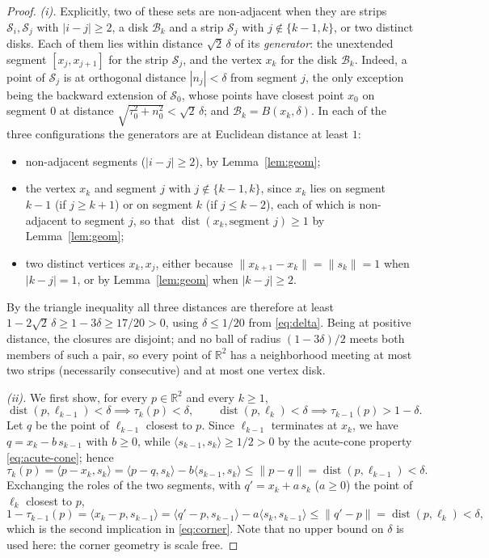 \documentclass[11pt]{article}
\newcommand{\R}{\mathbb{R}}
\newcommand{\ip}[2]{\langle #1,#2\rangle}
\begin{document}
\begin{proof}
\emph{(i).}
Explicitly, two of these sets are non-adjacent when they are strips $\mathcal S_i, \mathcal S_j$ with $|i-j| \ge 2$, a disk $\mathcal B_k$ and a strip $\mathcal S_j$ with $j \notin \{k-1, k\}$, or two distinct disks.
Each of them lies within distance $\sqrt2\,\delta$ of its \emph{generator}: the unextended segment $[x_j, x_{j+1}]$ for the strip $\mathcal S_j$, and the vertex $x_k$ for the disk $\mathcal B_k$.
Indeed, a point of $\mathcal S_j$ is at orthogonal distance $|n_j| < \delta$ from segment $j$, the only exception being the backward extension of $\mathcal S_0$, whose points have closest point $x_0$ on segment $0$ at distance $\sqrt{\tau_0^2 + n_0^2} < \sqrt2\,\delta$; and $\mathcal B_k = B(x_k, \delta)$.
In each of the three configurations the generators are at Euclidean distance at least $1$:
\begin{itemize}
\item non-adjacent segments ($|i-j| \ge 2$), by Lemma~\ref{lem:geom};
\item the vertex $x_k$ and segment $j$ with $j \notin \{k-1, k\}$, since $x_k$ lies on segment $k-1$ (if $j \ge k+1$) or on segment $k$ (if $j \le k-2$), each of which is non-adjacent to segment $j$, so that $\operatorname{dist}(x_k, \text{segment } j) \ge 1$ by Lemma~\ref{lem:geom};
\item two distinct vertices $x_k, x_j$, either because $\|x_{k+1}-x_k\| = \|s_k\| = 1$ when $|k-j| = 1$, or by Lemma~\ref{lem:geom} when $|k-j| \ge 2$.
\end{itemize}
By the triangle inequality all three distances are therefore at least $1 - 2\sqrt2\,\delta \ge 1-3\delta \ge 17/20 > 0$, using $\delta \le 1/20$ from \eqref{eq:delta}.
Being at positive distance, the closures are disjoint; and no ball of radius $(1-3\delta)/2$ meets both members of such a pair, so every point of $\R^2$ has a neighborhood meeting at most two strips (necessarily consecutive) and at most one vertex disk.

\emph{(ii).}
We first show, for every $p \in \R^2$ and every $k \ge 1$,
\begin{equation}
\label{eq:corner}
\operatorname{dist}(p, \ell_{k-1}) < \delta \implies \tau_k(p) < \delta,
\qquad
\operatorname{dist}(p, \ell_k) < \delta \implies \tau_{k-1}(p) > 1-\delta.
\end{equation}
Let $q$ be the point of $\ell_{k-1}$ closest to $p$.
Since $\ell_{k-1}$ terminates at $x_k$, we have $q = x_k - b\,s_{k-1}$ with $b \ge 0$, while $\ip{s_{k-1}}{s_k} \ge 1/2 > 0$ by the acute-cone property \eqref{eq:acute-cone}; hence
\[
\tau_k(p) = \ip{p-x_k}{s_k} = \ip{p-q}{s_k} - b\ip{s_{k-1}}{s_k} \le \|p-q\| = \operatorname{dist}(p, \ell_{k-1}) < \delta.
\]
Exchanging the roles of the two segments, with $q' = x_k + a\,s_k$ ($a \ge 0$) the point of $\ell_k$ closest to $p$,
\[
1 - \tau_{k-1}(p) = \ip{x_k-p}{s_{k-1}} = \ip{q'-p}{s_{k-1}} - a\ip{s_k}{s_{k-1}} \le \|q'-p\| = \operatorname{dist}(p, \ell_k) < \delta,
\]
which is the second implication in \eqref{eq:corner}.
Note that no upper bound on $\delta$ is used here: the corner geometry is scale free.


\end{proof}
\end{document}
